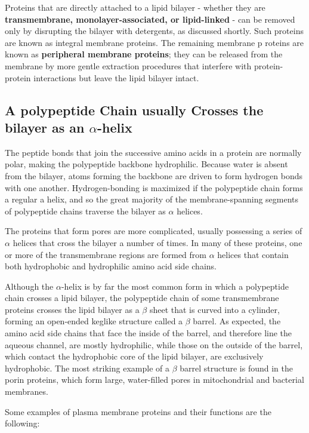 Proteins that are directly attached to a lipid bilayer - whether they are
\textbf{transmembrane, monolayer-associated, or lipid-linked} - can be removed
only by disrupting the bilayer with detergents, as discussed shortly. Such
proteins are known as integral membrane proteins. The remaining membrane p
roteins are known as \textbf{peripheral membrane proteins}; they can
be released from the membrane by more gentle extraction procedures
that interfere with protein-protein interactions but leave the lipid bilayer
intact.

\subsection{A polypeptide Chain usually Crosses the bilayer as an $\alpha$-helix}

The peptide bonds that join the successive amino acids in a protein are normally polar, making
the polypeptide backbone hydrophilic. Because water is
absent from the bilayer, atoms forming the backbone are driven to form
hydrogen bonds with one another. Hydrogen-bonding is maximized if the
polypeptide chain forms a regular a helix, and so the great majority of the
membrane-spanning segments of polypeptide chains traverse the bilayer
as $\alpha$ helices.

The proteins that form pores are more complicated, usually possessing a
series of $\alpha$ helices that cross the bilayer a number of times. In many of these proteins,
one or more of the transmembrane regions are formed from $\alpha$ helices
that contain both hydrophobic and hydrophilic amino acid side chains.

Although the $\alpha$-helix is by far the most common form in which a polypeptide
chain crosses a lipid bilayer, the polypeptide chain of some transmembrane
proteins crosses the lipid bilayer as a $\beta$ sheet that is curved into a
cylinder, forming an open-ended keglike structure called a $\beta$ barrel. As
expected, the amino acid side chains that face the inside of the barrel, and
therefore line the aqueous channel, are mostly hydrophilic, while those
on the outside of the barrel, which contact the hydrophobic core of the
lipid bilayer, are exclusively hydrophobic. The most striking example of a
$\beta$ barrel structure is found in the porin proteins, which form large, water-filled
pores in mitochondrial and bacterial membranes.

Some examples of plasma membrane proteins and their functions are the following:

